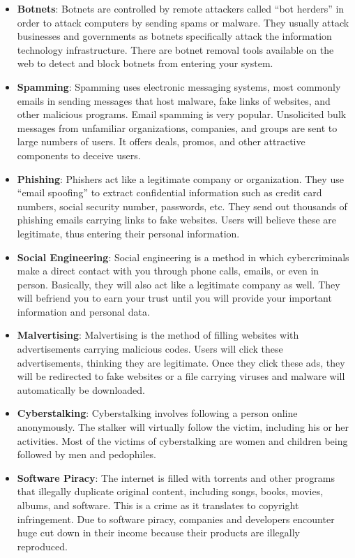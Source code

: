 \documentclass [12pt, a4paper]{article}
\begin{document}
\begin{itemize}
	\item \textbf{Botnets}: Botnets are controlled by remote attackers called “bot herders” in order to attack computers by sending spams or malware. They usually attack businesses and governments as botnets specifically attack the information technology infrastructure. There are botnet removal tools available on the web to detect and block botnets from entering your system.
	\item \textbf{Spamming}: Spamming uses electronic messaging systems, most commonly emails in sending messages that host malware, fake links of websites, and other malicious programs. Email spamming is very popular. Unsolicited bulk messages from unfamiliar organizations, companies, and groups are sent to large numbers of users. It offers deals, promos, and other attractive components to deceive users.
	\item \textbf{Phishing}: Phishers act like a legitimate company or organization. They use “email spoofing” to extract confidential information such as credit card numbers, social security number, passwords, etc. They send out thousands of phishing emails carrying links to fake websites. Users will believe these are legitimate, thus entering their personal information.
	\item \textbf{Social Engineering}: Social engineering is a method in which cybercriminals make a direct contact with you through phone calls, emails, or even in person. Basically, they will also act like a legitimate company as well. They will befriend you to earn your trust until you will provide your important information and personal data.
\item \textbf{Malvertising}: Malvertising is the method of filling websites with advertisements carrying malicious codes. Users will click these advertisements, thinking they are legitimate. Once they click these ads, they will be redirected to fake websites or a file carrying viruses and malware will automatically be downloaded.

\item \textbf{Cyberstalking}: Cyberstalking involves following a person online anonymously. The stalker will virtually follow the victim, including his or her activities. Most of the victims of cyberstalking are women and children being followed by men and pedophiles.

\item \textbf{Software Piracy}: The internet is filled with torrents and other programs that illegally duplicate original content, including songs, books, movies, albums, and software. This is a crime as it translates to copyright infringement. Due to software piracy, companies and developers encounter huge cut down in their income because their products are illegally reproduced.


\end{itemize}
\end{document}

